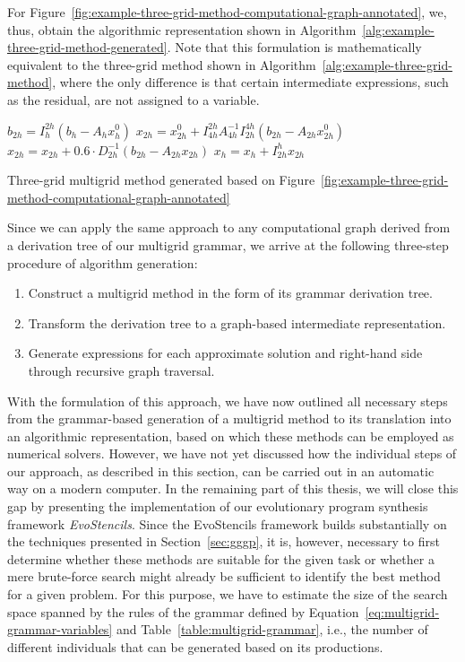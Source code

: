 For Figure~\ref{fig:example-three-grid-method-computational-graph-annotated}, we, thus, obtain the algorithmic representation shown in Algorithm~\ref{alg:example-three-grid-method-generated}.
Note that this formulation is mathematically equivalent to the three-grid method shown in Algorithm~\ref{alg:example-three-grid-method}, where the only difference is that certain intermediate expressions, such as the residual, are not assigned to a variable.
\begin{algorithm}
	\begin{algorithmic}[1]
		\State $ b_{2h} = I_{h}^{2h} \left(b_{h} - A_h x_{h}^0 \right)$
		\State $ x_{2h} = x^0_{2h} + I_{4h}^{2h} A_{4h}^{-1} I_{2h}^{4h} \left(b_{2h} - A_{2h} x^0_{2h}\right)$
		\State $ x_{2h} = x_{2h} + 0.6 \cdot D_{2h}^{-1} \left(b_{2h} - A_{2h} x_{2h}\right)$
		\State $x_{h} = x_{h}  + I_{2h}^h x_{2h}$
	\end{algorithmic}
	\caption{Three-grid multigrid method generated based on Figure~\ref{fig:example-three-grid-method-computational-graph-annotated}}
	\label{alg:example-three-grid-method-generated}
\end{algorithm}
Since we can apply the same approach to any computational graph derived from a derivation tree of our multigrid grammar, we arrive at the following three-step procedure of algorithm generation:
\begin{enumerate}
	\item Construct a multigrid method in the form of its grammar derivation tree.
	\item Transform the derivation tree to a graph-based intermediate representation.
	\item Generate expressions for each approximate solution and right-hand side through recursive graph traversal.
\end{enumerate}
With the formulation of this approach, we have now outlined all necessary steps from the grammar-based generation of a multigrid method to its translation into an algorithmic representation, based on which these methods can be employed as numerical solvers.
However, we have not yet discussed how the individual steps of our approach, as described in this section, can be carried out in an automatic way on a modern computer.
In the remaining part of this thesis, we will close this gap by presenting the implementation of our evolutionary program synthesis framework \emph{EvoStencils}.
Since the EvoStencils framework builds substantially on the techniques presented in Section~\ref{sec:gggp}, it is, however, necessary to first determine whether these methods are suitable for the given task or whether a mere brute-force search might already be sufficient to identify the best method for a given problem.
For this purpose, we have to estimate the size of the search space spanned by the rules of the grammar defined by Equation~\eqref{eq:multigrid-grammar-variables} and Table~\ref{table:multigrid-grammar}, i.e., the number of different individuals that can be generated based on its productions.

